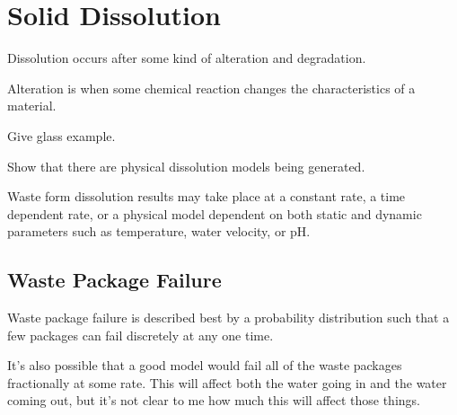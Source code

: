 \section{Solid Dissolution}

Dissolution occurs after some kind of alteration and degradation. 

Alteration is when some chemical reaction changes the characteristics  of a 
material. 

Give glass example.  

Show that there are physical dissolution models being generated. 

Waste form dissolution results may take place at a constant rate, a time 
dependent rate, or  a physical model dependent on both static and dynamic 
parameters such as temperature, water velocity, or pH. 

\subsection{Waste Package Failure}

Waste package failure is described best by a probability distribution such that 
a few packages can fail discretely at any one time. 

It's also possible that a good model would fail all of the waste packages 
fractionally at some rate. This will affect both the water going in and the 
water coming out, but it's not clear to me how much this will affect those 
things. 


